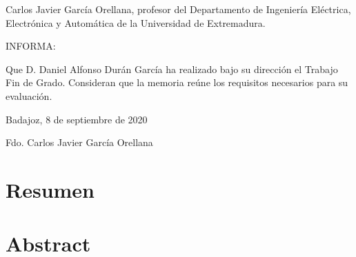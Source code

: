 \documentclass[12pt,dvipsnames,a4paper,twoside]{article}
\begin{document}


\shipout\null %

\pagestyle{empty}
\vspace*{5cm}

Carlos Javier García Orellana, profesor del
Departamento de Ingeniería Eléctrica, Electrónica y Automática de la Universidad de
Extremadura.

\vspace*{1cm}
INFORMA:

\vspace*{1cm}
Que D. Daniel Alfonso Durán García ha realizado
bajo su dirección el Trabajo Fin de Grado. Consideran que la memoria reúne
los requisitos necesarios para su evaluación.

\vspace*{1cm}
\begin{center}
Badajoz, 8 de septiembre de 2020


\vspace{5cm}
Fdo. Carlos Javier García Orellana
\end{center}

\newpage %
\setcounter{page}{1}
\pagestyle{plain}

\tableofcontents

\renewcommand{\thetable}{\thesection.\arabic{table}}
\renewcommand{\thefigure}{\thesection.\arabic{figure}}
\renewcommand{\theequation}{\thesection.\arabic{equation}}



\newpage
\section*{Resumen}




\section*{Abstract}


\end{document}
